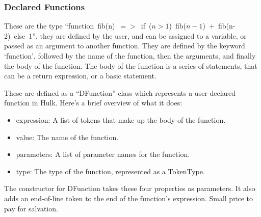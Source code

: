 \subsubsection{Declared Functions}

These are the type \hbox{``function fib{(n)} $=>$ if {($n > 1$)} fib{($n-1$)} $+$ fib{(n-2)} else 1''}, they are defined by the user, and can be assigned to a variable, or passed as an argument to another function. They are defined by the keyword `function', followed by the name of the function, then the arguments, and finally the body of the function. The body of the function is a series of statements, that can be a return expression, or a basic statement.

These are defined as a ``DFunction'' class which represents a user-declared function in Hulk. Here's a brief overview of what it does:

\begin{itemize}
    \item expression: A list of tokens that make up the body of the function.
    \item value: The name of the function.
    \item parameters: A list of parameter names for the function.
    \item type: The type of the function, represented as a TokenType.
\end{itemize}
The constructor for DFunction takes these four properties as parameters. It also adds an end-of-line token to the end of the function's expression. Small price to pay for salvation.

